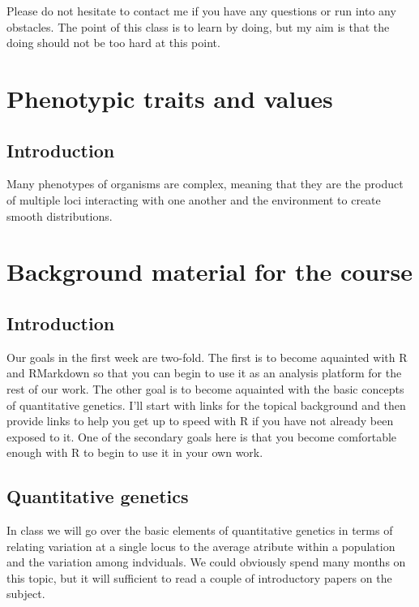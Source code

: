 \documentclass[
]{book}
\begin{document}
Please do not hesitate to contact me if you have any questions or run into any obstacles. The point of this class is to learn by doing, but my aim is that the doing should not be too hard at this point.

\hypertarget{phenotypic-traits-and-values}{%
\chapter{Phenotypic traits and values}\label{phenotypic-traits-and-values}}

\hypertarget{introduction-1}{%
\section{Introduction}\label{introduction-1}}

Many phenotypes of organisms are complex, meaning that they are the product of multiple loci interacting with one another and the environment to create smooth distributions.

\hypertarget{background-material-for-the-course-1}{%
\chapter{Background material for the course}\label{background-material-for-the-course-1}}

\hypertarget{introduction-2}{%
\section{Introduction}\label{introduction-2}}

Our goals in the first week are two-fold. The first is to become aquainted with R and RMarkdown so that you can begin to use it as an analysis platform for the rest of our work. The other goal is to become aquainted with the basic concepts of quantitative genetics. I'll start with links for the topical background and then provide links to help you get up to speed with R if you have not already been exposed to it. One of the secondary goals here is that you become comfortable enough with R to begin to use it in your own work.

\hypertarget{quantitative-genetics-1}{%
\section{Quantitative genetics}\label{quantitative-genetics-1}}

In class we will go over the basic elements of quantitative genetics in terms of relating variation at a single locus to the average atribute within a population and the variation among indviduals. We could obviously spend many months on this topic, but it will sufficient to read a couple of introductory papers on the subject.
\end{document}
